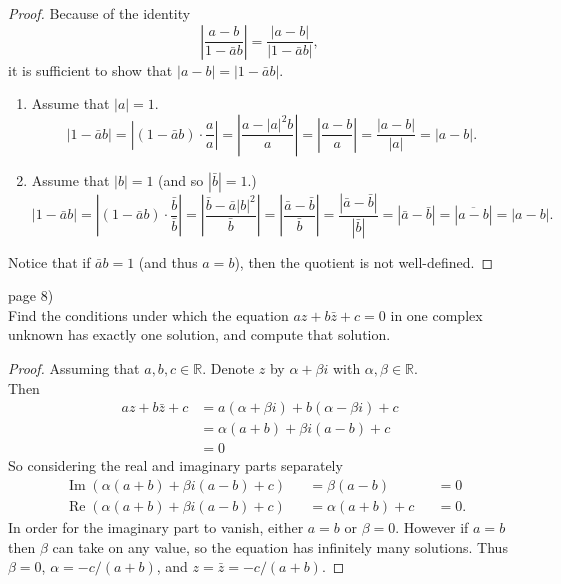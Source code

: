 \documentclass{article}
\newenvironment{problem}[2][Problem]{\begin{trivlist}
\item[\hskip \labelsep {\bfseries #1}\hskip \labelsep {\bfseries #2.}]}{\end{trivlist}}
\begin{document}
\begin{proof}
  Because of the identity \[
    \left|\frac{a - b}{1 - \bar{a}b}\right| =
    \frac{|a - b|}{|1 - \bar{a}b|},
  \] it is sufficient to show that $|a - b| = |1 - \bar{a}b|$.\\
  \begin{enumerate}
    \item Assume that $|a| = 1$. \[
      |1 - \bar{a}b|
      = \left|(1 - \bar{a}b)\cdot \frac{a}{a}\right|
      = \left|\frac{a - |a|^2b}{a}\right|
      = \left|\frac{a - b}{a}\right|
      = \frac{|a - b|}{|a|}
      = |a - b|.
    \]
    \item Assume that $|b| = 1$ (and so $|\bar{b}| = 1$.) \[
      |1 - \bar{a}b|
      = \left|(1 - \bar{a}b)\cdot \frac{\bar{b}}{\bar{b}}\right|
      = \left|\frac{\bar{b} - \bar{a}|b|^2}{\bar{b}}\right|
      = \left|\frac{\bar{a} - \bar{b}}{\bar{b}}\right|
      = \frac{|\bar{a} - \bar{b}|}{|\bar{b}|}
      = |\bar{a} - \bar{b}|
      = |\overline{a-b}|
      = |a - b|.
    \]
  \end{enumerate}

  Notice that if $\bar{a}b = 1$ (and thus $a = b$), then the quotient is not well-defined.
\end{proof}

\pagebreak

\begin{problem}{4} (page 8) \\
  Find the conditions under which the equation $az + b\bar{z} + c = 0$ in one
  complex unknown has exactly one solution, and compute that solution.
\end{problem}

\begin{proof}
  Assuming that $a, b, c \in \mathbb{R}$. Denote $z$ by $\alpha + \beta i$ with
  $\alpha, \beta \in \mathbb{R}$.\\
  Then \begin{align*}
    az + b\bar{z} + c
    &= a(\alpha + \beta i) + b(\alpha - \beta i) + c \\
    &= \alpha(a + b) + \beta i(a - b) + c \\
    &= 0
  \end{align*}
  So considering the real and imaginary parts separately \begin{align*}
  &\operatorname{Im}(\alpha(a + b) + \beta i(a - b) + c) &&= \beta(a - b)      &&= 0\\
  &\operatorname{Re}(\alpha(a + b) + \beta i(a - b) + c) &&= \alpha(a + b) + c &&= 0.
  \end{align*}
  In order for the imaginary part to vanish, either $a = b$ or $\beta = 0$.
  However if $a = b$ then $\beta$ can take on any value, so the equation has
  infinitely many solutions. Thus $\beta = 0$, $\alpha = -c/(a + b)$, and $z = \bar{z} = -c/(a + b)$.
\end{proof}
\end{document}

